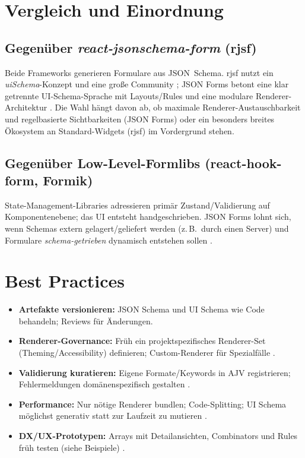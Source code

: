 \documentclass[11pt,a4paper]{article}
\begin{document}
\section{Vergleich und Einordnung}
\subsection{Gegen\"uber \emph{react-jsonschema-form} (rjsf)}
Beide Frameworks generieren Formulare aus JSON~Schema. rjsf nutzt ein \emph{uiSchema}-Konzept und eine gro{\ss}e Community \cite{rjsf-docs}; JSON Forms betont eine klar getrennte UI-Schema-Sprache mit Layouts/Rules und eine modulare Renderer-Architektur \cite{jsonforms-uischema,jsonforms-core}. Die Wahl h\"angt davon ab, ob maximale Renderer-Austauschbarkeit und regelbasierte Sichtbarkeiten (JSON Forms) oder ein besonders breites \"Okosystem an Standard-Widgets (rjsf) im Vordergrund stehen.

\subsection{Gegen\"uber Low-Level-Formlibs (react-hook-form, Formik)}
State-Management-Libraries adressieren prim\"ar Zustand/Validierung auf Komponentenebene; das UI entsteht handgeschrieben. JSON Forms lohnt sich, wenn Schemas extern gelagert/geliefert werden (z.\,B.\ durch einen Server) und Formulare \emph{schema-getrieben} dynamisch entstehen sollen \cite{jsonforms-what,jsonforms-react}.

\section{Best Practices}
\begin{itemize}
  \item \textbf{Artefakte versionieren:} JSON Schema und UI Schema wie Code behandeln; Reviews f\"ur \"Anderungen.
  \item \textbf{Renderer-Governance:} Fr\"uh ein projektspezifisches Renderer-Set (Theming/Accessibility) definieren; Custom-Renderer f\"ur Spezialf\"alle \cite{jsonforms-material}.
  \item \textbf{Validierung kuratieren:} Eigene Formate/Keywords in AJV registrieren; Fehlermeldungen dom\"anenspezifisch gestalten \cite{ajv-guide}.
  \item \textbf{Performance:} Nur n\"otige Renderer bundlen; Code-Splitting; UI Schema m\"oglichst generativ statt zur Laufzeit zu mutieren \cite{jsonforms-material}.
  \item \textbf{DX/UX-Prototypen:} Arrays mit Detailansichten, Combinators und Rules fr\"uh testen (siehe Beispiele) \cite{jsonforms-examples}.
\end{itemize}
\end{document}
